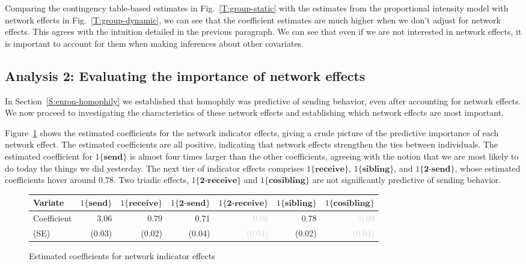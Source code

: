 \documentclass[final]{statsoc}
\begin{document}
Comparing the contingency table-based estimates in Fig.~\ref{T:group-static}
with the estimates from the proportional intensity model with network effects
in Fig.~\ref{T:group-dynamic}, we can see that the coefficient estimates are
much higher when we don't adjust for network effects.  This agrees with the
intuition detailed in the previous paragraph.  We can see that even if we are
not interested in network effects, it is important to account for them when
making inferences about other covariates.

\subsection{Analysis 2: Evaluating the importance of network effects}
\label{S:enron-network}

In Section~\ref{S:enron-homophily} we established that homophily was
predictive of sending behavior, even after accounting for network effects.  We
now proceed to investigating the characteristics of these network effects and
establishing which network effects are most important.

Figure~\ref{F:enron-net-indicator} shows the estimated coefficients for the
network indicator effects, giving a crude picture of the predictive importance
of each network effect.  The estimated coefficients are all positive,
indicating that network effects strengthen the ties between individuals.  The
estimated coefficient for $1\{\textbf{send}\}$ is almost four times larger
than the other coefficients, agreeing with the notion that we are most likely
to do today the things we did yesterday.  The next tier of indicator effects
comprises $1\{\textbf{receive}\}$, $1\{\textbf{sibling}\}$, and
$1\{\textbf{2-send}\}$, whose estimated coefficients hover around $0.78$.
Two triadic effects, $1\{\textbf{2-receive}\}$ and
$1\{\textbf{cosibling}\}$ are not significantly predictive of sending behavior.

\begin{figure}
\centering
\footnotesize
\begin{tabular}{lrrrrrr}
\toprule
Variate
& $1\{\textbf{send}\}$
& $1\{\textbf{receive}\}$
& $1\{\textbf{2-send}\}$
& $1\{\textbf{2-receive}\}$
& $1\{\textbf{sibling}\}$
& $1\{\textbf{cosibling}\}$
\\
\midrule
Coefficient
& 3.06
& 0.79
& 0.71
& \textcolor{LightGray}{0.08}
& 0.78
& \textcolor{LightGray}{0.09}
\\
(SE)
& \tiny{(0.03)}
& \tiny{(0.02)}
& \tiny{(0.04)}
& \textcolor{LightGray}{\tiny{(0.04)}}
& \tiny{(0.02)}
& \textcolor{LightGray}{\tiny{(0.04)}}
\\
\bottomrule
\end{tabular}
\normalsize
\caption{Estimated coefficients for network indicator effects}
\label{F:enron-net-indicator}
\end{figure}
\end{document}
